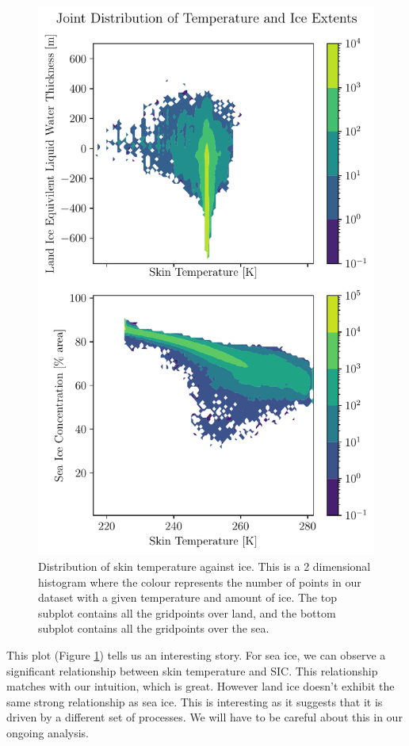 \documentclass[../main.tex]{subfiles}
\begin{document}
\begin{figure}[h!]
    \centering
    \includegraphics{images/week8/hres/distribution_of_temperature_ice}
    \caption{Distribution of skin temperature against ice. This is a 2 dimensional histogram where the colour represents the number of points in our dataset with a given temperature and amount of ice. The top subplot contains all the gridpoints over land, and the bottom subplot contains all the gridpoints over the sea.}
    \label{fig:joint_distribuition_temp_ice}
\end{figure}

This plot (Figure \ref{fig:joint_distribuition_temp_ice}) tells us an interesting story. For sea ice, we can observe a significant relationship between skin temperature and SIC. This relationship matches with our intuition, which is great. However land ice doesn't exhibit the same strong relationship as sea ice. This is interesting as it suggests that it is driven by a different set of processes. We will have to be careful about this in our ongoing analysis.
\end{document}
